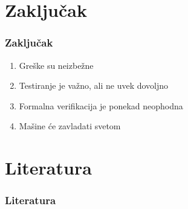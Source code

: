 \documentclass{beamer}
\begin{document}
\section{Zaključak}
\begin{frame}
\frametitle{Zaključak}
\begin{enumerate}
\item Greške su neizbežne
\item Testiranje je važno, ali ne uvek dovoljno
\item Formalna verifikacija je ponekad neophodna \cite{laski2009software}
\item Mašine će zavladati svetom
\end{enumerate}
\end{frame}

\section{Literatura}
\begin{frame}

\frametitle{Literatura}


\end{frame}
\end{document}
